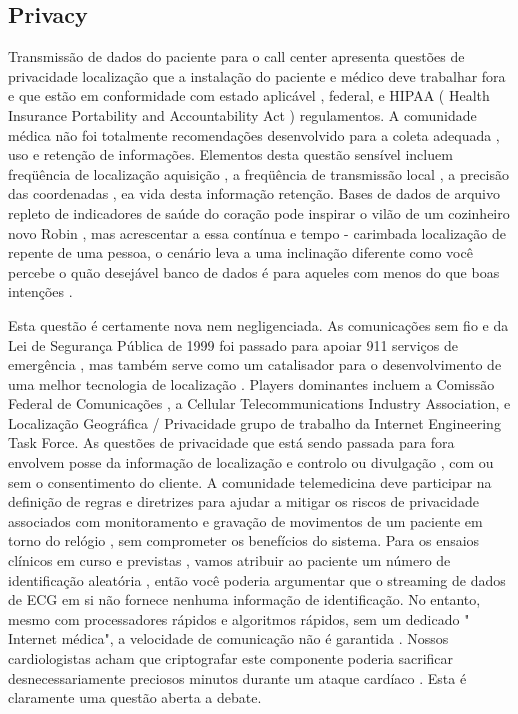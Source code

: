 \documentclass[12pt]{article} %
\begin{document}

\subsection{Privacy} %

Transmissão de dados do paciente para o call center apresenta questões de privacidade localização que a instalação do paciente e médico deve trabalhar fora e que estão em conformidade com estado aplicável , federal, e HIPAA ( Health Insurance Portability and Accountability Act ) regulamentos. A comunidade médica não foi totalmente recomendações desenvolvido para a coleta adequada , uso e retenção de informações. Elementos desta questão sensível incluem freqüência de localização aquisição , a freqüência de transmissão local , a precisão das coordenadas , ea vida desta informação retenção. Bases de dados de arquivo repleto de indicadores de saúde do coração pode inspirar o vilão de um cozinheiro novo Robin , mas acrescentar a essa contínua e tempo - carimbada localização de repente de uma pessoa, o cenário leva a uma inclinação diferente como você percebe o quão desejável banco de dados é para aqueles com menos do que boas intenções .

Esta questão é certamente nova nem negligenciada. As comunicações sem fio e da Lei de Segurança Pública de 1999 foi passado para apoiar 911 serviços de emergência , mas também serve como um catalisador para o desenvolvimento de uma melhor tecnologia de localização . Players dominantes incluem a Comissão Federal de Comunicações , a Cellular Telecommunications Industry Association, e Localização Geográfica / Privacidade grupo de trabalho da Internet Engineering Task Force. As questões de privacidade que está sendo passada para fora envolvem posse da informação de localização e controlo ou divulgação , com ou sem o consentimento do cliente. A comunidade telemedicina deve participar na definição de regras e diretrizes para ajudar a mitigar os riscos de privacidade associados com monitoramento e gravação de movimentos de um paciente em torno do relógio , sem comprometer os benefícios do sistema. Para os ensaios clínicos em curso e previstas , vamos atribuir ao paciente um número de identificação aleatória , então você poderia argumentar que o streaming de dados de ECG em si não fornece nenhuma informação de identificação. No entanto, mesmo com processadores rápidos e algoritmos rápidos, sem um dedicado " Internet médica", a velocidade de comunicação não é garantida . Nossos cardiologistas acham que criptografar este componente poderia sacrificar desnecessariamente preciosos minutos durante um ataque cardíaco . Esta é claramente uma questão aberta a debate.
\end{document}
